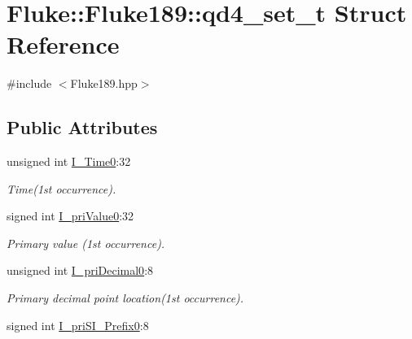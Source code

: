 \hypertarget{structFluke_1_1Fluke189_1_1qd4__set__t}{
\section{Fluke::Fluke189::qd4\_\-set\_\-t Struct Reference}
\label{structFluke_1_1Fluke189_1_1qd4__set__t}
}


{\ttfamily \#include $<$Fluke189.hpp$>$}\subsection*{Public Attributes}
\begin{DoxyCompactItemize}
\item 
\hypertarget{structFluke_1_1Fluke189_1_1qd4__set__t_aee3686bfee0729b20df1d66d009da4ab}{
unsigned int \hyperlink{structFluke_1_1Fluke189_1_1qd4__set__t_aee3686bfee0729b20df1d66d009da4ab}{I\_\-Time0}:32}
\label{structFluke_1_1Fluke189_1_1qd4__set__t_aee3686bfee0729b20df1d66d009da4ab}

\begin{DoxyCompactList}\small\item\em Time(1st occurrence). \item\end{DoxyCompactList}\item 
\hypertarget{structFluke_1_1Fluke189_1_1qd4__set__t_aeda9cc12bf24e9dfd3c0d323d6a51088}{
signed int \hyperlink{structFluke_1_1Fluke189_1_1qd4__set__t_aeda9cc12bf24e9dfd3c0d323d6a51088}{I\_\-priValue0}:32}
\label{structFluke_1_1Fluke189_1_1qd4__set__t_aeda9cc12bf24e9dfd3c0d323d6a51088}

\begin{DoxyCompactList}\small\item\em Primary value (1st occurrence). \item\end{DoxyCompactList}\item 
\hypertarget{structFluke_1_1Fluke189_1_1qd4__set__t_ad1db6cbca231348faee26e998c23c83f}{
unsigned int \hyperlink{structFluke_1_1Fluke189_1_1qd4__set__t_ad1db6cbca231348faee26e998c23c83f}{I\_\-priDecimal0}:8}
\label{structFluke_1_1Fluke189_1_1qd4__set__t_ad1db6cbca231348faee26e998c23c83f}

\begin{DoxyCompactList}\small\item\em Primary decimal point location(1st occurrence). \item\end{DoxyCompactList}\item 
\hypertarget{structFluke_1_1Fluke189_1_1qd4__set__t_ab2debfb496c7b2291aa2a0c2f9e64a36}{
signed int \hyperlink{structFluke_1_1Fluke189_1_1qd4__set__t_ab2debfb496c7b2291aa2a0c2f9e64a36}{I\_\-priSI\_\-Prefix0}:8}
\label{structFluke_1_1Fluke189_1_1qd4__set__t_ab2debfb496c7b2291aa2a0c2f9e64a36}


\end{DoxyCompactItemize}
